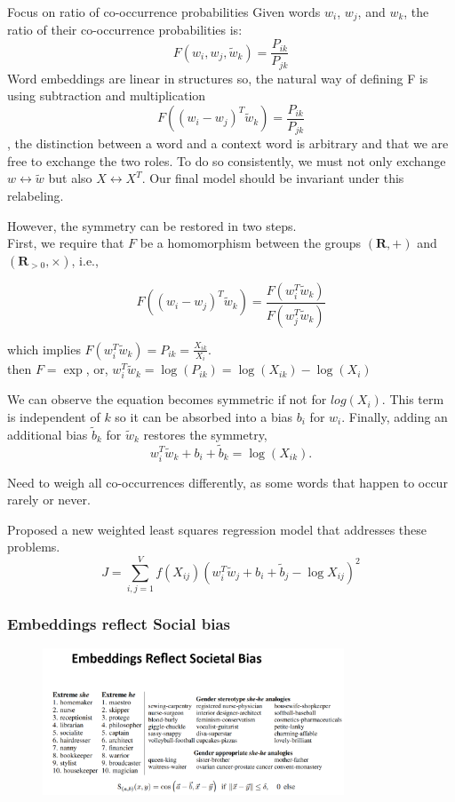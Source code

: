 \documentclass[12pt]{article}
\begin{document}
            Focus on ratio of co-occurrence probabilities
            Given words $w_i$, $w_j$, and $w_k$, the ratio of their co-occurrence probabilities is:
            \[
                F(w_i, w_j, \tilde{w}_k) = \frac{P_{ik}}{P_{jk}}
            \]
            Word embeddings are linear in structures
            so, the natural way of defining F is using subtraction and multiplication
            \[
                F((w_i-w_j)^T\tilde{w}_k) = \frac{P_{ik}}{P_{jk}}
            \]
            , the distinction between a word and a context word is arbitrary and that we are free to 
            exchange the two roles. To do so consistently, we must not only exchange $w \leftrightarrow 
            \tilde{w}$ but also $X \leftrightarrow X^T$. Our final model should be invariant under this relabeling.
            
            However, the symmetry can be restored in two steps. \\
            First, we require that $F$ be a 
            homomorphism between the groups $(\textbf{R},+)$ and $(\textbf{R}_{>0}, \times)$, i.e.,
            
            \[
                F((w_i - w_j)^T \tilde{w}_k) = \frac{F(w_i^T \tilde{w}_k)}{ F(w_j^T \tilde{w}_k)}
            \]

            which implies $F(w_i^T \tilde{w}_k) = P_{ik} = \frac{X_{ik}}{X_i}$. \\
            then $F = \exp$, or, $w_i^T \tilde{w}_k = \log(P_{ik}) = \log(X_{ik}) - \log(X_i)$

            We can observe the equation becomes symmetric if not for $log(X_i)$.
            This term is independent of $k$ so it can be absorbed into a bias $b_i$ for $w_i$. Finally, adding an additional bias $\tilde{b}_k$ for $\tilde{w}_k$ restores the symmetry,
            \[w_i^T \tilde{w}_k + b_i + \tilde{b}_k = \log(X_{ik}).\]

            Need to weigh all co-occurrences differently, as some words
            that happen to occur rarely or never. 

            Proposed a new weighted least squares regression model that addresses these problems.
            \[
                J = \sum_{i,j=1}^{V} f(X_{ij}) (w_i^T \tilde{w}_j + b_i + \tilde{b}_j - \log X_{ij})^2
            \]

        \subsubsection{Embeddings reflect Social bias}
        \begin{figure}[ht]
            \centering
            \includegraphics[width=0.8\textwidth]{images/emb_bias.png}
        \end{figure}
\end{document}
